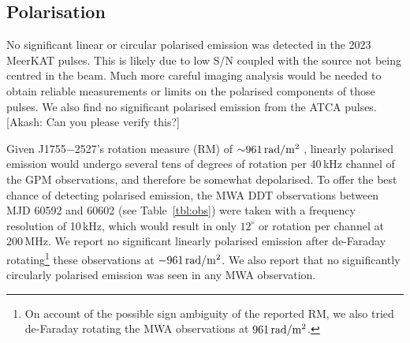 \documentclass[fleqn,usenatbib]{mnras}
\newcommand{\todo}[1]{{\color{red}#1}}
\newcommand{\src}{J1755$-$2527}
\newcommand{\Tab}{Table}
\begin{document}


\subsection{Polarisation} \label{sec:polarisation}

No significant linear or circular polarised emission was detected in the 2023 MeerKAT pulses.
This is likely due to low S/N coupled with the source not being centred in the beam.
Much more careful imaging analysis would be needed to obtain reliable measurements or limits on the polarised components of those pulses.
We also find no significant polarised emission from the ATCA pulses. \todo{[Akash: Can you please verify this?]}

Given \src{}'s rotation measure (RM) of ${\sim}961\,{\rm rad}/{\rm m}^2$ , linearly polarised emission would undergo several tens of degrees of rotation per 40\,kHz channel of the GPM observations, and therefore be somewhat depolarised.
To offer the best chance of detecting polarised emission, the MWA DDT observations between MJD 60592 and 60602 (see \Tab~\ref{tbl:obs}) were taken with a frequency resolution of 10\,kHz, which would result in only $12^\circ$ or rotation per channel at 200\,MHz.
We report no significant linearly polarised emission after de-Faraday rotating\footnote{On account of the possible sign ambiguity of the reported RM, we also tried de-Faraday rotating the MWA observations at $961\,{\rm rad}/{\rm m}^2$.} these observations at $-961\,{\rm rad}/{\rm m}^2$.
We also report that no significantly circularly polarised emission was seen in any MWA observation.
\end{document}
